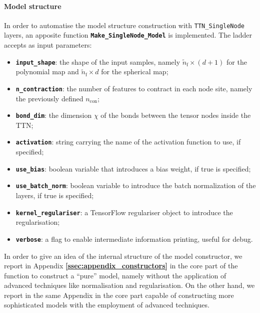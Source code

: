 \documentclass[../main/main.tex]{subfiles}
\begin{document}
\paragraph{Model structure}
In order to automatise the model structure construction with \texttt{TTN\_SingleNode} layers, an apposite function \texttt{\bfseries Make\_SingleNode\_Model} is implemented. The ladder accepts as input parameters:
\begin{itemize}
    \item \texttt{\bfseries input\_shape}: the shape of the input samples, namely \( \tilde{n}_{\mathrm{f}} \times (d+1) \) for the polynomial map and \( \tilde{n}_{\mathrm{f}} \times d \) for the spherical map;
    \item \texttt{\bfseries n\_contraction}: the number of features to contract in each node site, namely the previously defined \( n_{\mathrm{con}} \);
    \item \texttt{\bfseries bond\_dim}: the dimension \( \chi \) of the bonds between the tensor nodes inside the TTN;
    \item \texttt{\bfseries activation}: string carrying the name of the activation function to use, if specified;
    \item \texttt{\bfseries use\_bias}: boolean variable that introduces a bias weight, if true is specified;
    \item \texttt{\bfseries use\_batch\_norm}: boolean variable to introduce the batch normalization of the layers, if true is specified;
    \item \texttt{\bfseries kernel\_regulariser}: a TensorFlow regulariser object to introduce the regularisation;
    \item \texttt{\bfseries verbose}: a flag to enable intermediate information printing, useful for debug.
\end{itemize}
In order to give an idea of the internal structure of the model constructor, we report in Appendix \textbf{\ref{ssec:appendix_constructors}} in  the core part of the function to construct a ``pure'' model, namely without the application of advanced techniques like normalisation and regularisation. On the other hand, we report in the same Appendix in  the core part capable of constructing more sophisticated models with the employment of advanced techniques.


\end{document}
